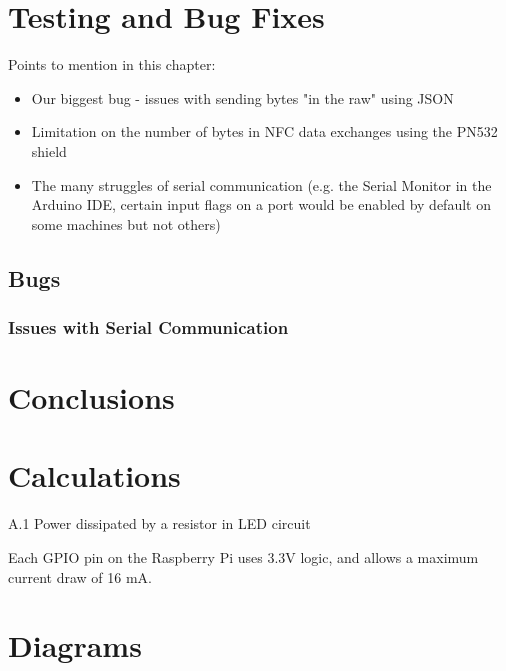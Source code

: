 \documentclass[12pt]{report}
\let\Oldsection\section
\renewcommand{\section}{\FloatBarrier\Oldsection}
\let\Oldsubsection\subsection
\renewcommand{\subsection}{\FloatBarrier\Oldsubsection}
\begin{document}

\chapter{Testing and Bug Fixes} \label{testing-and-bug-fixes}

Points to mention in this chapter:
\begin{itemize}
    \item Our biggest bug - issues with sending bytes "in the raw" using JSON
    \item Limitation on the number of bytes in NFC data exchanges using the PN532 shield
    \item The many struggles of serial communication (e.g. the Serial Monitor in the Arduino IDE, certain input flags 
    on a port would be enabled by default on some machines but not others)
\end{itemize}

\section{Bugs} \label{bugs}

\subsection{Issues with Serial Communication} \label{issues-with-serial-communcation}


\chapter{Conclusions} \label{conclusions}


\printbibliography


\appendix


\chapter{Calculations} \label{appendix:calculations}

A.1 Power dissipated by a resistor in LED circuit

Each GPIO pin on the Raspberry Pi uses 3.3V logic, and allows a maximum current draw of 16 mA. 


\chapter{Diagrams} \label{appendix:diagrams}
\end{document}
